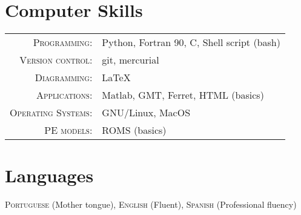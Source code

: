 \documentclass[pagestart=firstchapter]{article}
\begin{document}

\section*{Computer Skills}

\begin{tabular}{rl}
    \textsc{Programming}: & Python, Fortran 90, C, Shell script (bash)\\
    \textsc{Version control}: & git, mercurial\\
    \textsc{Diagramming}: & \LaTeX\\
    \textsc{Applications}: & Matlab, GMT, Ferret, \textsc{HTML} (basics)\\
    \textsc{Operating Systems}: & GNU/Linux, MacOS\\
    \textsc{PE models}: &ROMS (basics)    
\end{tabular}



\section*{Languages}

\textsc{Portuguese} (Mother tongue), \textsc{English} (Fluent), \textsc{Spanish} (Professional fluency)




%
%

\end{document}
